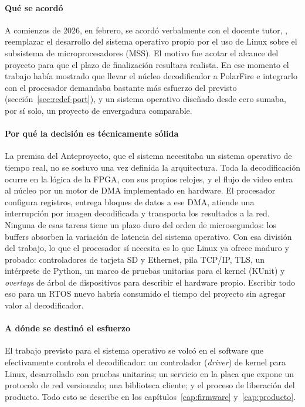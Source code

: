 \paragraph{Qué se acordó}
A comienzos de 2026, en febrero, se acordó verbalmente con el docente tutor,
\tutor, reemplazar el desarrollo del sistema operativo propio por el uso de
Linux sobre el subsistema de microprocesadores (MSS). El motivo fue acotar el
alcance del proyecto para que el plazo de finalización resultara realista.
En ese momento el trabajo había mostrado que llevar el núcleo decodificador a
PolarFire e integrarlo con el procesador demandaba bastante más esfuerzo del
previsto (sección~\ref{sec:redef-port}), y un sistema operativo diseñado
desde cero sumaba, por sí solo, un proyecto de envergadura comparable.

\paragraph{Por qué la decisión es técnicamente sólida}
La premisa del Anteproyecto, que el sistema necesitaba un sistema operativo de
tiempo real, no se sostuvo una vez definida la arquitectura. Toda la
decodificación ocurre en la lógica de la FPGA, con sus propios relojes, y el
flujo de video entra al núcleo por un motor de DMA implementado en hardware.
El procesador configura registros, entrega bloques de datos a ese DMA, atiende
una interrupción por imagen decodificada y transporta los resultados a la red.
Ninguna de esas tareas tiene un plazo duro del orden de microsegundos: los
buffers absorben la variación de latencia del sistema operativo. Con esa
división del trabajo, lo que el procesador sí necesita es lo que Linux ya
ofrece maduro y probado: controladores de tarjeta SD y Ethernet, pila TCP/IP,
TLS, un intérprete de Python, un marco de pruebas unitarias para el kernel
(KUnit) y \emph{overlays} de árbol de dispositivos para describir el hardware
propio. Escribir todo eso para un RTOS nuevo habría consumido el tiempo del
proyecto sin agregar valor al decodificador.

\paragraph{A dónde se destinó el esfuerzo}
El trabajo previsto para el sistema operativo se volcó en el software que
efectivamente controla el decodificador: un controlador (\emph{driver}) de
kernel para Linux, desarrollado con pruebas unitarias; un servicio en la
placa que expone un protocolo de red versionado; una biblioteca cliente; y el
proceso de liberación del producto. Todo esto se describe en los
capítulos~\ref{cap:firmware} y~\ref{cap:producto}.

